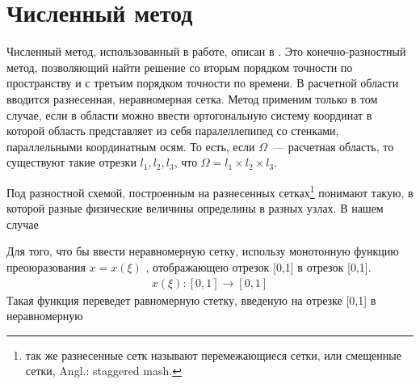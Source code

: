\section*{Численный метод}

Численный метод, использованный в работе, описан в \cite{method}. Это конечно-разностный метод, позволяющий найти решение со вторым порядком точности по пространству и с третьим порядком точности по времени. В расчетной области вводится разнесенная, неравномерная сетка. Метод применим только в том случае, если в области можно ввести ортогональную систему координат в которой область представляет из себя паралеллепипед со стенками, параллельными координатным осям. То есть, если $\Omega$~--- расчетная область, то существуют такие отрезки $l_1, l_2, l_3$, что $\Omega = l_1 \times l_2 \times l_3$. 

Под разностной схемой, построенным на разнесенных сетках\footnote{так же разнесенные сетк называют перемежающиеся сетки, или смещенные сетки, Angl.: staggered mash.} понимают такую, в которой разные физические величины определины в разных узлах. В нашем случае

Для того, что бы ввести неравномерную сетку, использу монотонную функцию преоюразования $ x = x(\xi) $  , отображающею отрезок [0,1] в отрезок [0,1]. 
\begin{gather}
  x(\xi): [0,1] \longrightarrow [0,1]
\end{gather}
Такая функция переведет равномерную стетку, введеную на отрезке [0,1] в неравномерную